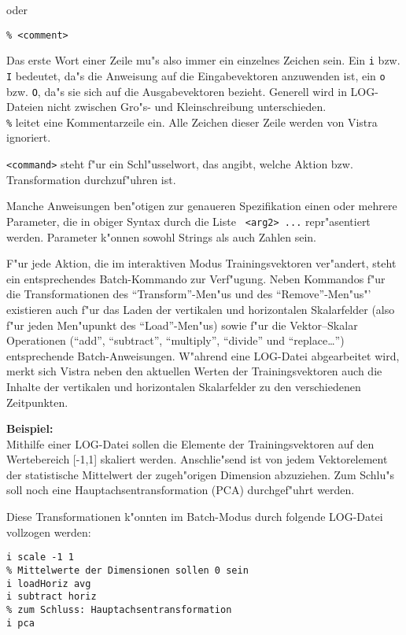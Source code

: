 oder

{\tt \% <comment>}

Das erste Wort einer Zeile mu"s also immer ein einzelnes Zeichen sein.
Ein {\tt i} bzw. {\tt I} bedeutet, da"s die Anweisung auf die Eingabevektoren
anzuwenden ist, ein {\tt o} bzw. {\tt O}, da"s sie sich auf die
Ausgabevektoren bezieht. 
Generell wird in LOG-Dateien nicht zwischen Gro"s- und
Kleinschreibung unterschieden. \\  
{\tt \%} leitet eine Kommentarzeile ein. 
Alle Zeichen dieser Zeile werden von Vistra ignoriert.   

{\tt <command>} steht f"ur ein Schl"usselwort, das angibt, welche
Aktion bzw. Transformation durchzuf"uhren ist.

Manche Anweisungen ben"otigen zur genaueren Spezifikation einen oder
mehrere Parameter, die in obiger Syntax durch die Liste 
{\tt <arg1> <arg2> ...} repr"asentiert werden. 
Parameter k"onnen sowohl Strings als auch Zahlen sein.
 
F"ur jede Aktion, die im interaktiven Modus
Trainingsvektoren ver"andert, steht ein entsprechendes Batch-Kommando
zur Verf"ugung.
Neben Kommandos f"ur die Transformationen des "`Transform"'-Men"us und
des "`Remove"'-Men"us"' existieren auch f"ur das Laden der vertikalen
und horizontalen Skalarfelder (also f"ur jeden Men"upunkt des "`Load"'-Men"us)
sowie f"ur die Vektor--Skalar Operationen ("`add"', "`subtract"', "`multiply"',
"`divide"' und "`replace\ldots"') entsprechende Batch-Anweisungen.
W"ahrend eine LOG-Datei abgearbeitet wird, merkt sich Vistra neben den
aktuellen Werten der Trainingsvektoren auch die Inhalte der vertikalen
und horizontalen Skalarfelder zu den verschiedenen Zeitpunkten.

{\bf Beispiel:} \\
Mithilfe einer LOG-Datei sollen die Elemente der Trainingsvektoren auf
den Wertebereich [-1,1] skaliert werden.
Anschlie"send ist von jedem Vektorelement der statistische Mittelwert
der zugeh"origen Dimension abzuziehen. 
Zum Schlu"s soll noch eine Hauptachsentransformation (PCA) durchgef"uhrt
werden. 

\begin{samepage}
Diese Transformationen k"onnten im Batch-Modus durch folgende LOG-Datei
vollzogen werden:
\begin{verbatim}
i scale -1 1
% Mittelwerte der Dimensionen sollen 0 sein
i loadHoriz avg
i subtract horiz
% zum Schluss: Hauptachsentransformation
i pca
\end{verbatim}  
\end{samepage}
 

